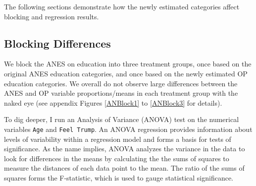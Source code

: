 \documentclass[12pt,econ]{sources/authesis}
\begin{document}
The following sections demonstrate how the newly estimated categories affect blocking and regression results.

\hypertarget{ordblock-data-blockdiff}{%
\subsection{Blocking Differences}\label{ordblock-data-blockdiff}}

We block the ANES on education into three treatment groups, once based on the original ANES education categories, and once based on the newly estimated OP education categories. We overall do not observe large differences between the ANES and OP variable proportions/means in each treatment group with the naked eye (see appendix Figures \ref{ANBlock1} to \ref{ANBlock3} for details).

To dig deeper, I run an Analysis of Variance (ANOVA) test on the numerical variables \texttt{Age} and \texttt{Feel\ Trump}. An ANOVA regression provides information about levels of variability within a regression model and forms a basis for tests of significance. As the name implies, ANOVA analyzes the variance in the data to look for differences in the means by calculating the the sums of squares to measure the distances of each data point to the mean. The ratio of the sums of squares forms the F-statistic, which is used to gauge statistical significance.
\end{document}

